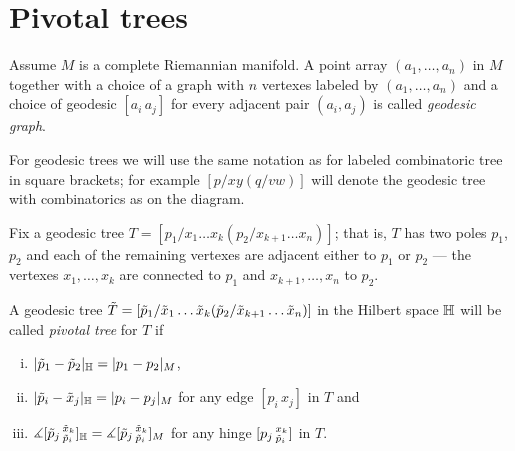 \section{Pivotal trees}\label{sec:pivotal} 

\begin{wrapfigure}{r}{27 mm}
\vskip-0mm
\end{wrapfigure}

Assume $M$ is a complete Riemannian manifold.
A point array $(a_1,\dots,a_n)$ in $M$ together with a choice of a graph with $n$ vertexes labeled by  $(a_1,\dots,a_n)$ and a choice of geodesic $[a_i\,a_j]$ for every adjacent pair $(a_i,a_j)$ is called \emph{geodesic graph}.

For geodesic trees we will use the same notation as for labeled combinatoric tree in square brackets;
for example $[p/xy(q/vw)]$ will denote the geodesic tree with combinatorics as on the diagram.

Fix a geodesic tree $T=[p_1/x_1\dots x_k(p_2/x_{k+1}\dots x_n)]$;
that is, $T$ has two poles $p_1$, $p_2$ and each of the remaining vertexes are adjacent either to $p_1$ or $p_2$ --- the vertexes $x_1,\dots, x_k$ are connected to $p_1$ and $x_{k+1},\dots, x_n$ to $p_2$.

A geodesic tree  $\~T=[\~p_1/\~x_1\dots \~x_k(\~p_2/\~x_{k+1}\dots \~x_n)]$ in the Hilbert space $\HH$ will be called \emph{pivotal tree} for $T$
if 
\begin{enumerate}[(i)]
\item $|\~p_1-\~p_2|_\HH= |p_1-p_2|_M$,
\item $|\~p_i-\~x_j|_\HH= |p_i-p_j|_M$ for any edge $[p_i\,x_j]$ in $T$ and
\item $\measuredangle[\~p_j\,^{\~x_k}_{\~p_i}]_{\HH}=\measuredangle[\~p_j\,^{\~x_k}_{\~p_i}]_M$
for any hinge  $[p_j\,^{x_k}_{\~p_i}]$ in $T$.
\end{enumerate}


